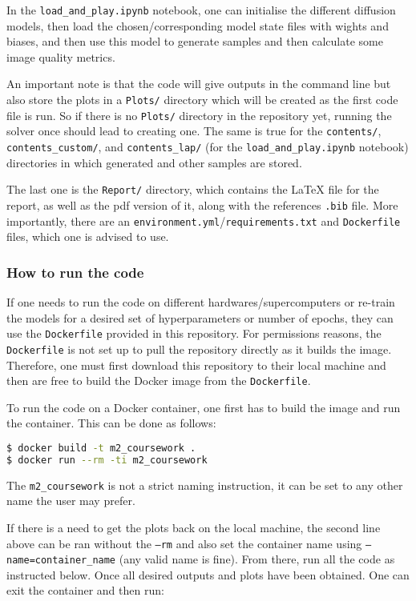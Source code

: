 \documentclass[12pt]{report} %
\begin{document}
In the \texttt{load\_and\_play.ipynb} notebook, one can initialise the different diffusion models, then load the chosen/corresponding model state files with wights and biases, and then use this model to generate samples and then calculate some image quality metrics.

An important note is that the code will give outputs in the command line but also store the plots in a \texttt{Plots/} directory which will be created as the first code file is run. So if there is no \texttt{Plots/} directory in the repository yet, running the solver once should lead to creating one. The same is true for the \texttt{contents/}, \texttt{contents\_custom/}, and \texttt{contents\_lap/} (for the \texttt{load\_and\_play.ipynb} notebook) directories in which generated and other samples are stored.


The last one is the \texttt{Report/} directory, which contains the LaTeX file for the report, as well as the pdf version of it, along with the references \texttt{.bib} file.
More importantly, there are an \texttt{environment.yml}/\texttt{requirements.txt} and \texttt{Dockerfile} files, which one is advised to use.

\subsubsection{How to run the code}

If one needs to run the code on different hardwares/supercomputers or re-train the models for a desired set of hyperparameters or number of epochs, they can use the \texttt{Dockerfile} provided in this repository. For permissions reasons, the \texttt{Dockerfile} is not set up to pull the repository directly as it builds the image. Therefore, one must first download this repository to their local machine and then are free to build the Docker image from the \texttt{Dockerfile}.

To run the code on a Docker container, one first has to build the image and run the container. This can be done as follows:

\begin{lstlisting}[language=bash]
$ docker build -t m2_coursework .
$ docker run --rm -ti m2_coursework
\end{lstlisting}

The \texttt{m2\_coursework} is not a strict naming instruction, it can be set to any other name the user may prefer.

If there is a need to get the plots back on the local machine, the second line above can be ran without the \texttt{--rm} and also set the container name using \texttt{--name=container\_name} (any valid name is fine). From there, run all the code as instructed below. Once all desired outputs and plots have been obtained. One can exit the container and then run:
\end{document}
